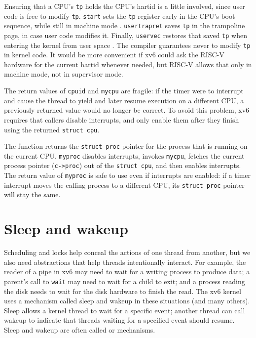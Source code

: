 Ensuring that a CPU's \lstinline{tp} holds the CPU's
hartid is a little involved, since user code is free
to modify \lstinline{tp}. \lstinline{start} sets the \lstinline{tp}
register early in the CPU's boot sequence, while still in machine mode
.
\lstinline{usertrapret} saves \lstinline{tp} in the trampoline
page, in case user code modifies it.
Finally, \lstinline{uservec} restores that saved \lstinline{tp}
when entering the kernel from user space
.
The compiler guarantees never to modify \lstinline{tp}
in kernel code.
It would be more convenient if xv6 could ask the RISC-V
hardware for the current hartid whenever needed,
but RISC-V allows that only in
machine mode, not in supervisor mode.

The return values of
\lstinline{cpuid}
and
\lstinline{mycpu}
are fragile: if the timer were to interrupt and cause
the thread to yield and later resume execution on a different CPU,
a previously returned value would no longer be correct.
To avoid this problem, xv6 requires that callers 
disable interrupts, and only enable
them after they finish using the returned
\lstinline{struct cpu}.

The function
returns the
\lstinline{struct proc}
pointer
for the process that is running on the current CPU.
\lstinline{myproc}
disables interrupts, invokes
\lstinline{mycpu},
fetches the current process pointer
(\lstinline{c->proc})
out of the
\lstinline{struct cpu},
and then enables interrupts.
The return value of
\lstinline{myproc}
is safe to use even if interrupts are enabled:
if a timer interrupt moves the calling process to a
different CPU, its
\lstinline{struct proc}
pointer will stay the same.
\section{Sleep and wakeup}
\label{sec:sleep}

Scheduling and locks help conceal the actions of one thread
from another,
but we also need abstractions that help
threads intentionally interact.
For example, the reader of a pipe in xv6 may need to wait
for a writing process to produce data;
a parent's call to \lstinline{wait} may need to
wait for a child to exit; and
a process reading the disk needs to wait
for the disk hardware to finish the read.
The xv6 kernel uses a mechanism called sleep and wakeup
in these situations (and many others).
Sleep allows a kernel thread to
wait for a specific event; another thread can call wakeup 
to indicate that threads waiting for a specified event should resume.
Sleep and wakeup are often called 
or 
mechanisms.

